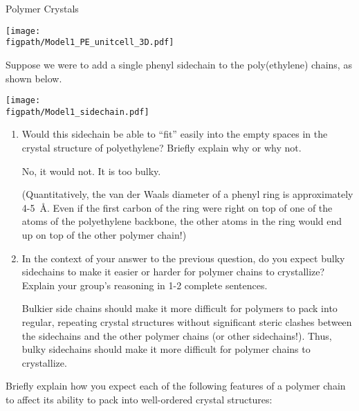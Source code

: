 \begin{activity}{Polymer Crystals}
\begin{infobox}
	\vspace{6pt}
	\centerline{\texttt{[image: \\figpath/Model1\_PE\_unitcell\_3D.pdf]}}

\end{infobox}

\begin{ctqs}
	
	\question Suppose we were to add a single phenyl sidechain to the poly(ethylene) chains, as shown below.

	\vspace{6pt}
	\centerline{\texttt{[image: \\figpath/Model1\_sidechain.pdf]}}	
	
		\begin{enumerate}
		
			\item Would this sidechain be able to ``fit'' easily into the empty spaces in the crystal structure of polyethylene?  Briefly explain why or why not.
	
		\begin{solution}[0.75in]{}
			No, it would not.  It is too bulky.
			
			(Quantitatively, the van der Waals diameter of a phenyl ring is approximately 4-5~\AA.  Even if the first carbon of the ring were right on top of one of the atoms of the polyethylene backbone, the other atoms in the ring would end up on top of the other polymer chain!)
		\end{solution}
			
			\item In the context of your answer to the previous question, do you expect bulky sidechains to make it easier or harder for polymer chains to crystallize?  Explain your group's reasoning in 1-2 complete sentences.
	
		\begin{solution}[1in]{}
			Bulkier side chains should make it more difficult for polymers to pack into regular, repeating crystal structures without significant steric clashes between the sidechains and the other polymer chains (or other sidechains!).  Thus, bulky sidechains should make it more difficult for polymer chains to crystallize.
		\end{solution}
			
		\end{enumerate}
	
	\question Briefly explain how you expect each of the following features of a polymer chain to affect its ability to pack into well-ordered crystal structures:
	

\end{ctqs}
\end{activity}
